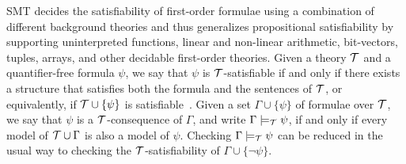 \documentclass[a4paper]{llncs}
\begin{document}
\smallskip{}
%
SMT decides the satisfiability of first-order formulae using a
combination of different background theories and thus generalizes
propositional satisfiability by supporting uninterpreted functions,
linear and non-linear arithmetic, bit-vectors, tuples, arrays, and other
decidable first-order theories. Given a theory ${\cal T}$ and a
quantifier-free formula $\psi$, we say that $\psi$ is $\cal
T$-satisfiable if and only if there exists a structure that satisfies
both the formula and the sentences of ${\cal T}$, or equivalently, if
${\cal T}\cup \{\psi\}$ is satisfiable~\cite{Bradley07}. Given a set
$\Gamma\cup \{\psi\}$ of formulae over $\cal T$, we say that $\psi$ is a
$\cal T$-consequence of $\Gamma$, and write $\Gamma\models_{\cal
T}\psi$, if and only if every model of ${\cal T}\cup\Gamma$ is also a
model of $\psi$.  Checking $\Gamma\models_{\cal T}\psi$ can be reduced
in the usual way to checking the $\cal T$-satisfiability of
$\Gamma\cup\{\neg\psi\}$.
\end{document}
